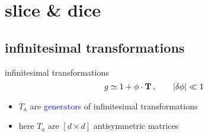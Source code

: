 \section{slice \& dice}

\subsection[Lie groups]{infinitesimal transformations}

\begin{frame}{} %
\begin{block}{infinitesimal transformations}
\[
g
 \simeq  1 + {\bf \phi} \cdot \mathbf{T} \,, \qquad \vert \delta {\bf \phi} \vert \ll 1
\]
\end{block}
\begin{block}{} %
\begin{itemize}
  \item $T_a$ are \textcolor{blue}{generators} of infinitesimal
transformations
  \item here $T_a$ are $[d\!\times\!d]$ antisymmetric matrices
\end{itemize}
\end{block}
\end{frame}

